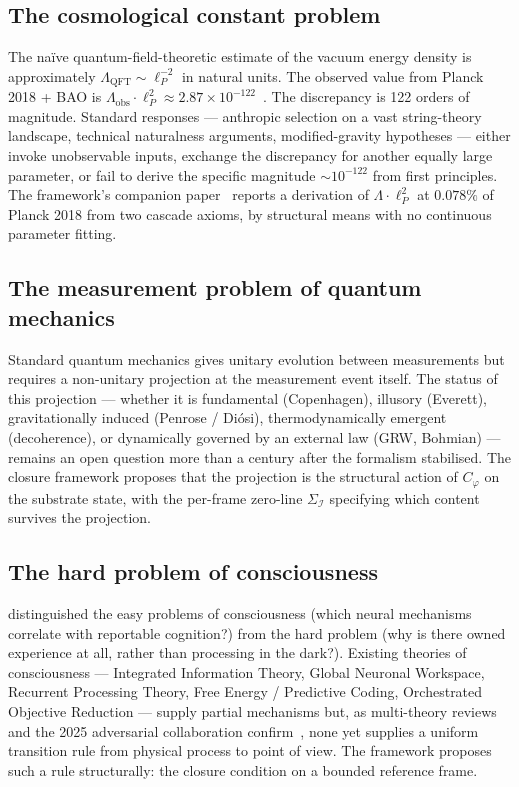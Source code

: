 \documentclass[11pt]{article}
\theoremstyle{plain}
\theoremstyle{definition}
\theoremstyle{remark}
\newcommand{\Ical}{\mathcal{I}}
\newcommand{\Cph}{C_\varphi}
\begin{document}
\subsection{The cosmological constant problem}

The na\"ive quantum-field-theoretic estimate of the vacuum energy density is approximately $\Lambda_{\mathrm{QFT}} \sim \ell_P^{-2}$ in natural units. The observed value from Planck 2018 + BAO is $\Lambda_{\mathrm{obs}} \cdot \ell_P^2 \approx 2.87 \times 10^{-122}$~\citep{Planck2018}. The discrepancy is 122 orders of magnitude. Standard responses --- anthropic selection on a vast string-theory landscape, technical naturalness arguments, modified-gravity hypotheses --- either invoke unobservable inputs, exchange the discrepancy for another equally large parameter, or fail to derive the specific magnitude $\sim 10^{-122}$ from first principles. The framework's companion paper~\citep{SmartHypersphereCosmology} reports a derivation of $\Lambda \cdot \ell_P^2$ at $0.078\%$ of Planck 2018 from two cascade axioms, by structural means with no continuous parameter fitting.

\subsection{The measurement problem of quantum mechanics}

Standard quantum mechanics gives unitary evolution between measurements but requires a non-unitary projection at the measurement event itself. The status of this projection --- whether it is fundamental (Copenhagen), illusory (Everett), gravitationally induced (Penrose / Di\'osi), thermodynamically emergent (decoherence), or dynamically governed by an external law (GRW, Bohmian) --- remains an open question more than a century after the formalism stabilised. The closure framework proposes that the projection is the structural action of $\Cph$ on the substrate state, with the per-frame zero-line $\Sigma_\Ical$ specifying which content survives the projection.

\subsection{The hard problem of consciousness}

\citet{Chalmers1995} distinguished the easy problems of consciousness (which neural mechanisms correlate with reportable cognition?) from the hard problem (why is there owned experience at all, rather than processing in the dark?). Existing theories of consciousness --- Integrated Information Theory, Global Neuronal Workspace, Recurrent Processing Theory, Free Energy / Predictive Coding, Orchestrated Objective Reduction --- supply partial mechanisms but, as multi-theory reviews and the 2025 adversarial collaboration confirm~\citep{ConsciousnessAdversarial, ConsciousnessFiveTheories, ConsciousnessUnderSpotlight}, none yet supplies a uniform transition rule from physical process to point of view. The framework proposes such a rule structurally: the closure condition on a bounded reference frame.
\end{document}
